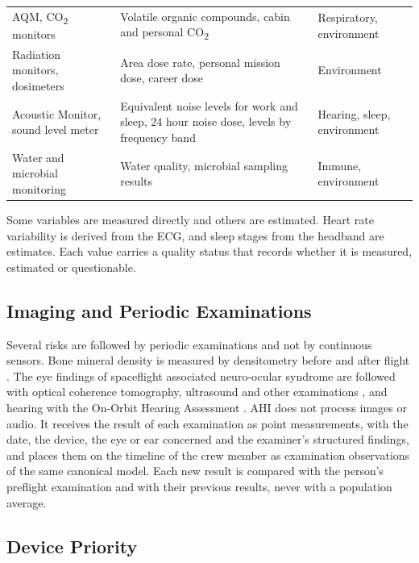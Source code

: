 \begin{table}[htbp]
\begin{tabular}{p{3.0cm}p{6.4cm}p{4.6cm}}
AQM, CO\textsubscript{2} monitors & Volatile organic compounds, cabin and personal CO\textsubscript{2} & Respiratory, environment \\
Radiation monitors, dosimeters & Area dose rate, personal mission dose, career dose & Environment \\
Acoustic Monitor, sound level meter & Equivalent noise levels for work and sleep, 24 hour noise dose, levels by frequency band & Hearing, sleep, environment \\
Water and microbial monitoring & Water quality, microbial sampling results & Immune, environment \\
\hline
\end{tabular}
\vspace{1.2em}
\end{table}

Some variables are measured directly and others are estimated. Heart rate variability is derived from the ECG, and sleep stages from the headband are estimates. Each value carries a quality status that records whether it is measured, estimated or questionable.

\subsection{Imaging and Periodic Examinations}
\label{subsec:imaging}

Several risks are followed by periodic examinations and not by continuous sensors. Bone mineral density is measured by densitometry before and after flight \cite{lang2004bone,leblanc2007skeletal}. The eye findings of spaceflight associated neuro-ocular syndrome are followed with optical coherence tomography, ultrasound and other examinations \cite{nasa_hrr_sans,macias2020ocular}, and hearing with the On-Orbit Hearing Assessment \cite{coste2024hearing}. AHI does not process images or audio. It receives the result of each examination as point measurements, with the date, the device, the eye or ear concerned and the examiner's structured findings, and places them on the timeline of the crew member as examination observations of the same canonical model. Each new result is compared with the person's preflight examination and with their previous results, never with a population average.

\subsection{Device Priority}
\label{subsec:device-priority}

